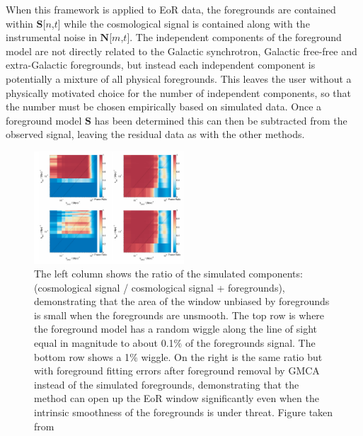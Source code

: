 When this framework is applied to EoR data, the foregrounds are contained within $\mathbf{S}$[$n$,$t$] while the cosmological signal is contained along with the instrumental noise in $\mathbf{N}$[$m$,$t$]. The independent components of the foreground model are not directly related to the Galactic synchrotron, Galactic free-free and extra-Galactic foregrounds, but instead each independent component is potentially a mixture of all physical foregrounds. This leaves the user without a physically motivated choice for the number of independent components, so that the number must be chosen empirically based on simulated data. Once a foreground model $\mathbf{S}$ has been determined this can then be subtracted from the observed signal, leaving the residual data as with the other methods.

\begin{figure}
\begin{center}
    \includegraphics[width=0.5\textwidth]{Images/Em_window.png}
\end{center}
    \caption{The left column shows the ratio of the simulated components: (cosmological signal / cosmological signal + foregrounds), demonstrating that the area of the window unbiased by foregrounds is small when the foregrounds are unsmooth. The top row is where the foreground model has a random wiggle along the line of sight equal in magnitude to about 0.1$\%$ of the foregrounds signal. The bottom row shows a 1$\%$ wiggle. On the right is the same ratio but with foreground fitting errors after foreground removal by GMCA instead of the simulated foregrounds, demonstrating that the method can open up the EoR window significantly even when the intrinsic smoothness of the foregrounds is under threat. Figure taken from \citet{Chapman2016MNRAS.458.2928C}}
    \label{fig:Chap_window}
\end{figure}

